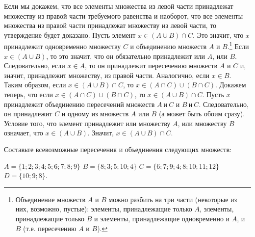\begin{prf}
Если мы докажем, что все элементы множества из левой части принадлежат множеству из правой части требуемого равенства и наоборот, что все элементы множества из правой части принадлежат множеству из левой части, то утверждение будет доказано. Пусть элемент $x \in (A \cup B) \cap C$. Это значит, что $x$ принадлежит одновременно множеству $C$ и объединению множеств $A$ и $B$.\footnote{Объединение множеств $A$ и $B$ можно разбить на три части (некоторые из них, возможно, пустые): элементы, принадлежащие
только $A$, элементы, принадлежащие только $B$ и элементы, принадлежащие одновременно и $A$, и $B$ (т.е. пересечению $A$ и $B$).} Если $x \in (A \cup B)$, то это значит, что он обязательно принадлежит или $A$, или $B$. Следовательно, если $x \in A$, то он принадлежит пересечению множеств $A$ и $C$ и, значит, принадлежит множеству, из правой части. Аналогично, если $x \in B$. Таким образом, если $x \in (A \cup B) \cap C$, то $x \in (A \cap C) \cup (B \cap C)$. Докажем теперь, что если $x \in (A \cap C) \cup (B \cap C)$, то $x \in (A \cup B) \cap C$. Пусть $x$ принадлежит объединению пересечений множеств $A~и~C$ и $B~и~C$. Следовательно, он принадлежит $C$ и одному из множеств $A$ или $B$ (а может быть обоим сразу). Условие того, что элемент принадлежит или множеству $A$, или множеству $B$ означает, что $x \in (A \cup B)$. Значит, $x \in (A \cup B) \cap C$.
\end{prf}

\begin{ex}\label{5.0 u5}
Составьте всевозможные пересечения и объединения следующих множеств:
\par
$A = \{1; 2; 3; 4; 5; 6; 7; 8; 9\}$
$B = \{8; 3; 5; 10 ;4\}$ $C = \{6; 7; 9; 4; 8; 10; 11; 12\}$  $D=\{10; 9; 8\}$.
\end{ex}

